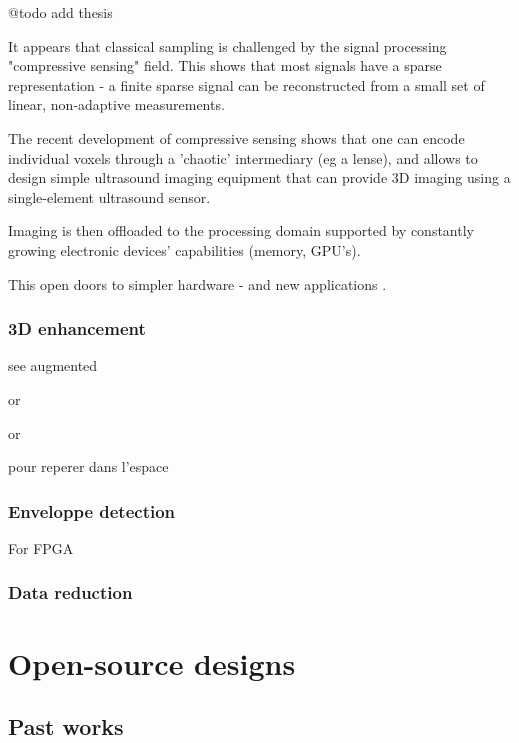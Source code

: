 \documentclass[conference]{IEEEtran}
\begin{document}
@todo add \cite{Fedjajevs_mscthesis_14_09_2016} thesis

It appears that classical sampling is challenged by the signal processing "compressive sensing" field. This shows that most signals have a sparse representation - a finite sparse signal can be reconstructed from a small set of linear, non-adaptive measurements.

The recent development of compressive sensing shows that one can encode individual voxels through a 'chaotic' intermediary (eg a lense), and allows to design simple ultrasound imaging equipment that can provide 3D imaging using a single-element ultrasound sensor.  

Imaging is then offloaded to the processing domain supported by constantly growing electronic devices' capabilities (memory, GPU's).


This open doors to simpler hardware - and new applications \cite{kruizinga_compressive_2017}.


\cite{hua_compressed_2011}

\subsubsection{3D enhancement}
 
see augmented \cite{herickhoff_low-cost_2018}

or 

\cite{poulsen_optical_2005.pdf}

or 

\cite{lorenzo_experimental_2009} pour reperer dans l'espace


\subsubsection{Enveloppe detection} 


For FPGA
\cite{chang_novel_2007}



\subsubsection{Data reduction}
 
 
\cite{soto-cajiga_fpga-based_2012}

\section{Open-source designs}

\subsection{Past works}
\end{document}
